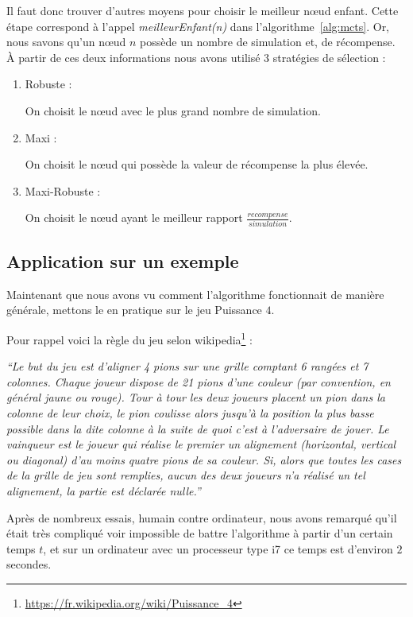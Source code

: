 \documentclass[pdftex,french, english]{article}	%
\begin{document}
Il faut donc trouver d'autres moyens pour choisir le meilleur nœud enfant. 
Cette étape correspond à l'appel \textit{meilleurEnfant(n)} dans l'algorithme~\ref{alg:mcts}. 
Or, nous savons qu'un nœud $n$ possède un nombre de simulation et, de récompense.
	À partir de ces deux informations nous avons utilisé 3 stratégies de sélection :
	\begin{enumerate}
		\item Robuste : 
		
		On choisit le nœud avec le plus grand nombre de simulation.
		\item Maxi :  
		
		On choisit le nœud qui possède la valeur de récompense la plus élevée.
		\item Maxi-Robuste :
		
		On choisit le nœud ayant le meilleur rapport $\frac{recompense}{simulation}$.
	\end{enumerate}
    
    
    
    
    
	\subsection{Application sur un exemple} \label{P4}
	Maintenant que nous avons vu comment l'algorithme fonctionnait de manière générale, mettons le en pratique sur le jeu Puissance $4$. 
    

    Pour rappel voici la règle du jeu selon wikipedia\footnote{\url{https://fr.wikipedia.org/wiki/Puissance_4}} :
   
    \begin{displayquote}
    \textit{``Le but du jeu est d'aligner 4 pions sur une grille comptant 6 rangées et 7 colonnes. Chaque joueur dispose de 21 pions d'une couleur (par convention, en général jaune ou rouge). Tour à tour les deux joueurs placent un pion dans la colonne de leur choix, le pion coulisse alors jusqu'à la position la plus basse possible dans la dite colonne à la suite de quoi c'est à l'adversaire de jouer. Le vainqueur est le joueur qui réalise le premier un alignement (horizontal, vertical ou diagonal) d'au moins quatre pions de sa couleur. Si, alors que toutes les cases de la grille de jeu sont remplies, aucun des deux joueurs n'a réalisé un tel alignement, la partie est déclarée nulle.''}
   	\end{displayquote}


	Après de nombreux essais, humain contre ordinateur, nous avons remarqué qu'il était très compliqué voir impossible de battre l'algorithme à partir d'un certain temps $t$, et sur un ordinateur avec un processeur type i7 ce temps est d'environ $2$ secondes.
	
\end{document}
